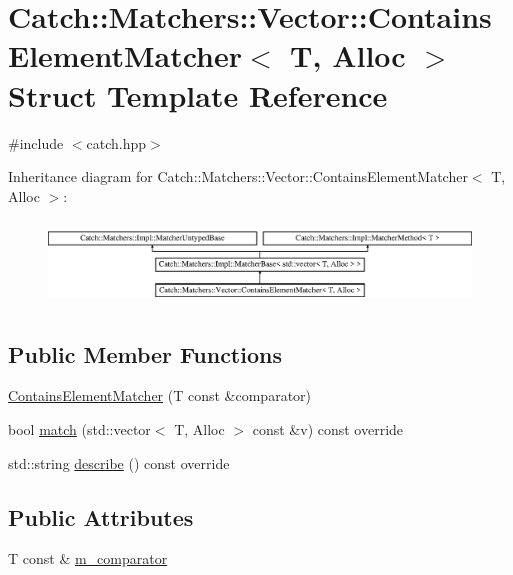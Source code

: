 \hypertarget{struct_catch_1_1_matchers_1_1_vector_1_1_contains_element_matcher}{}\section{Catch\+:\+:Matchers\+:\+:Vector\+:\+:Contains\+Element\+Matcher$<$ T, Alloc $>$ Struct Template Reference}
\label{struct_catch_1_1_matchers_1_1_vector_1_1_contains_element_matcher}


{\ttfamily \#include $<$catch.\+hpp$>$}

Inheritance diagram for Catch\+:\+:Matchers\+:\+:Vector\+:\+:Contains\+Element\+Matcher$<$ T, Alloc $>$\+:\begin{figure}[H]
\begin{center}
\leavevmode
\includegraphics[height=2.258065cm]{struct_catch_1_1_matchers_1_1_vector_1_1_contains_element_matcher}
\end{center}
\end{figure}
\subsection*{Public Member Functions}
\begin{DoxyCompactItemize}
\item 
\mbox{\hyperlink{struct_catch_1_1_matchers_1_1_vector_1_1_contains_element_matcher_a3f094e7ba2cf4764e784253818c506c8}{Contains\+Element\+Matcher}} (T const \&comparator)
\item 
bool \mbox{\hyperlink{struct_catch_1_1_matchers_1_1_vector_1_1_contains_element_matcher_ac39745f1d1e2f102121a443fad761de3}{match}} (std\+::vector$<$ T, Alloc $>$ const \&v) const override
\item 
std\+::string \mbox{\hyperlink{struct_catch_1_1_matchers_1_1_vector_1_1_contains_element_matcher_a4bcd9a471271ed4dadf5db7987baeeaa}{describe}} () const override
\end{DoxyCompactItemize}
\subsection*{Public Attributes}
\begin{DoxyCompactItemize}
\item 
T const  \& \mbox{\hyperlink{struct_catch_1_1_matchers_1_1_vector_1_1_contains_element_matcher_adecd94fee58a2fea0fc6d4d62a7a95ee}{m\+\_\+comparator}}
\end{DoxyCompactItemize}
